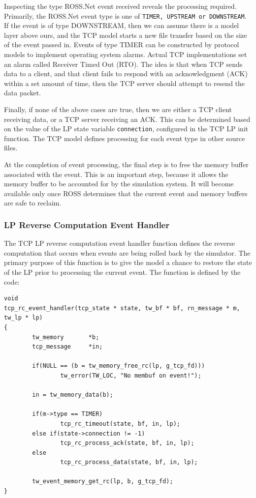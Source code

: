 \documentclass[12pt]{article}
\begin{document}
Inspecting the type ROSS.Net event received reveals the processing required.
Primarily, the ROSS.Net event type is one of {\tt TIMER, UPSTREAM or
  DOWNSTREAM}.  If the event is of type DOWNSTREAM, then we can assume there
is a model layer above ours, and the TCP model starts a new file transfer
based on the size of the event passed in.  Events of type TIMER can be
constructed by protocol models to implement operating system alarms.  Actual
TCP implementations set an alarm called Receiver Timed Out (RTO).  The idea is
that when TCP sends data to a client, and that client fails to respond with an
acknowledgment (ACK) within a set amount of time, then the TCP server should
attempt to resend the data packet.

Finally, if none of the above cases are true, then we are either a TCP client
receiving data, or a TCP server receiving an ACK.  This can be determined
based on the value of the LP state variable {\tt connection}, configured in
the TCP LP init function.  The TCP model defines processing for each event
type in other source files.

At the completion of event processing, the final step is to free the memory
buffer associated with the event.  This is an important step, because it
allows the memory buffer to be accounted for by the simulation system.  It
will become available only once ROSS determines that the current event and
memory buffers are safe to reclaim.

\subsubsection{LP Reverse Computation Event Handler}

The TCP LP reverse computation event handler function defines the reverse
computation that occurs when events are being rolled back by the simulator.
The primary purpose of this function is to give the model a chance to restore
the state of the LP prior to processing the current event.  The function is
defined by the code:

\begin{small}
\begin{verbatim}
void
tcp_rc_event_handler(tcp_state * state, tw_bf * bf, rn_message * m, tw_lp * lp)
{
        tw_memory       *b;
        tcp_message     *in;

        if(NULL == (b = tw_memory_free_rc(lp, g_tcp_fd)))
                tw_error(TW_LOC, "No membuf on event!");

        in = tw_memory_data(b);

        if(m->type == TIMER)
                tcp_rc_timeout(state, bf, in, lp);
        else if(state->connection != -1)
                tcp_rc_process_ack(state, bf, in, lp);
        else
                tcp_rc_process_data(state, bf, in, lp);

        tw_event_memory_get_rc(lp, b, g_tcp_fd);
}
\end{verbatim}
\end{small}
\end{document}
